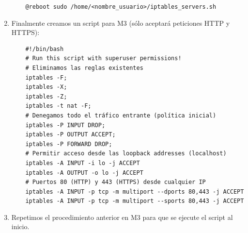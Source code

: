 \documentclass[12pt,spanish]{article}
\begin{document}
\begin{enumerate}
	\begin{lstlisting}
	@reboot sudo /home/<nombre_usuario>/iptables_servers.sh
	\end{lstlisting}
	\item Finalmente creamos un script para M3 (sólo aceptará peticiones HTTP y HTTPS):
	\begin{lstlisting}
	#!/bin/bash
	# Run this script with superuser permissions!
	# Eliminamos las reglas existentes
	iptables -F;
	iptables -X;
	iptables -Z;
	iptables -t nat -F;
	# Denegamos todo el tráfico entrante (política inicial)
	iptables -P INPUT DROP;
	iptables -P OUTPUT ACCEPT;
	iptables -P FORWARD DROP;
	# Permitir acceso desde las loopback addresses (localhost)
	iptables -A INPUT -i lo -j ACCEPT
	iptables -A OUTPUT -o lo -j ACCEPT
	# Puertos 80 (HTTP) y 443 (HTTPS) desde cualquier IP
	iptables -A INPUT -p tcp -m multiport --dports 80,443 -j ACCEPT
	iptables -A INPUT -p tcp -m multiport --sports 80,443 -j ACCEPT
	\end{lstlisting}
	\item Repetimos el procedimiento anterior en M3 para que se ejecute el script al inicio.
\end{enumerate}
\end{document}
